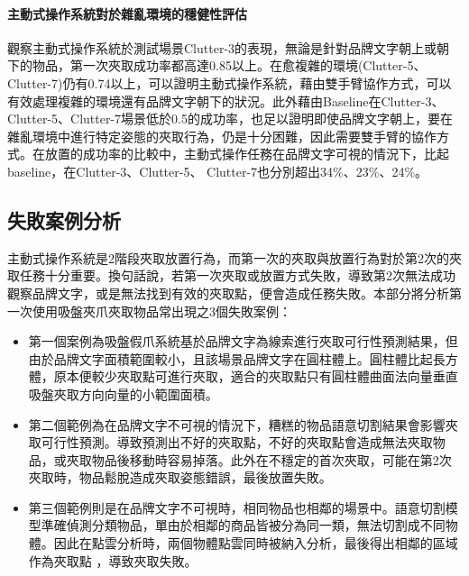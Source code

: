 \paragraph{主動式操作系統對於雜亂環境的穩健性評估}
觀察主動式操作系統於測試場景Clutter-3的表現，無論是針對品牌文字朝上或朝下的物品，第一次夾取成功率都高達0.85以上。在愈複雜的環境(Clutter-5、Clutter-7)仍有0.74以上，可以證明主動式操作系統，藉由雙手臂協作方式，可以有效處理複雜的環境還有品牌文字朝下的狀況。此外藉由Baseline在Clutter-3、Clutter-5、Clutter-7場景低於0.5的成功率，也足以證明即使品牌文字朝上，要在雜亂環境中進行特定姿態的夾取行為，仍是十分困難，因此需要雙手臂的協作方式。在放置的成功率的比較中，主動式操作任務在品牌文字可視的情況下，比起baseline，在Clutter-3、Clutter-5、 Clutter-7也分別超出34\%、23\%、24\%。

\subsection{失敗案例分析}
主動式操作系統是2階段夾取放置行為，而第一次的夾取與放置行為對於第2次的夾取任務十分重要。換句話說，若第一次夾取或放置方式失敗，導致第2次無法成功觀察品牌文字，或是無法找到有效的夾取點，便會造成任務失敗。本部分將分析第一次使用吸盤夾爪夾取物品常出現之3個失敗案例：
\begin{itemize}
\item 第一個案例為吸盤假爪系統基於品牌文字為線索進行夾取可行性預測結果，但由於品牌文字面積範圍較小，且該場景品牌文字在圓柱體上。圓柱體比起長方體，原本便較少夾取點可進行夾取，適合的夾取點只有圓柱體曲面法向量垂直吸盤夾取方向向量的小範圍面積。
\item 第二個範例為在品牌文字不可視的情況下，糟糕的物品語意切割結果會影響夾取可行性預測。導致預測出不好的夾取點，不好的夾取點會造成無法夾取物品，或夾取物品後移動時容易掉落。此外在不穩定的首次夾取，可能在第2次夾取時，物品鬆脫造成夾取姿態錯誤，最後放置失敗。
\item 第三個範例則是在品牌文字不可視時，相同物品也相鄰的場景中。語意切割模型準確偵測分類物品，單由於相鄰的商品皆被分為同一類，無法切割成不同物體。因此在點雲分析時，兩個物體點雲同時被納入分析，最後得出相鄰的區域作為夾取點
，導致夾取失敗。
\end{itemize}


